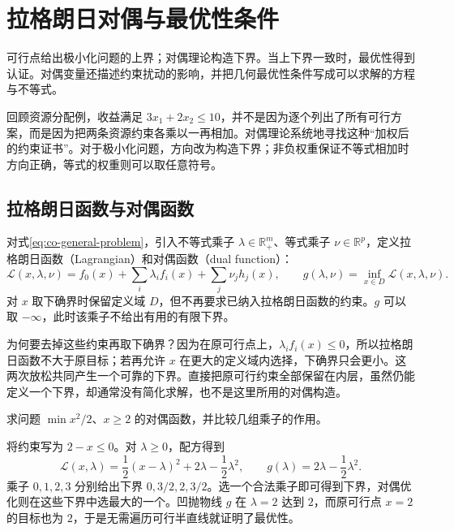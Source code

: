 \setcounter{chapter}{4} %
\chapter{拉格朗日对偶与最优性条件}
\label{ch:co-duality}

可行点给出极小化问题的上界；对偶理论构造下界。当上下界一致时，最优性得到认证。对偶变量还描述约束扰动的影响，并把几何最优性条件写成可以求解的方程与不等式。

回顾资源分配例，收益满足 $3x_1+2x_2\leq10$，并不是因为逐个列出了所有可行方案，而是因为把两条资源约束各乘以一再相加。对偶理论系统地寻找这种“加权后的约束证书”。对于极小化问题，方向改为构造下界；非负权重保证不等式相加时方向正确，等式的权重则可以取任意符号。

\section{拉格朗日函数与对偶函数}

对式\eqref{eq:co-general-problem}，引入不等式乘子 $\lambda\in\mathbb R_+^m$、等式乘子 $\nu\in\mathbb R^p$，定义拉格朗日函数（Lagrangian）和对偶函数（dual function）：
\begin{equation}
 \mathcal L(x,\lambda,\nu)=f_0(x)+\sum_i\lambda_i f_i(x)+\sum_j\nu_j h_j(x),
 \qquad g(\lambda,\nu)=\inf_{x\in D}\mathcal L(x,\lambda,\nu).
 \label{eq:co-lagrangian-dual-function}
\end{equation}
对 $x$ 取下确界时保留定义域 $D$，但不再要求已纳入拉格朗日函数的约束。$g$ 可以取 $-\infty$，此时该乘子不给出有用的有限下界。

为何要去掉这些约束再取下确界？因为在原可行点上，$\lambda_i f_i(x)\leq0$，所以拉格朗日函数不大于原目标；若再允许 $x$ 在更大的定义域内选择，下确界只会更小。这两次放松共同产生一个可靠的下界。直接把原可行约束全部保留在内层，虽然仍能定义一个下界，却通常没有简化求解，也不是这里所用的对偶构造。

\begin{example}[一个可以画出全部下界的对偶]
求问题 $\min x^2/2$、$x\geq2$ 的对偶函数，并比较几组乘子的作用。
\end{example}
\begin{solve}
将约束写为 $2-x\leq0$。对 $\lambda\geq0$，配方得到
\[
 \mathcal L(x,\lambda)=\frac12(x-\lambda)^2
                  +2\lambda-\frac12\lambda^2,\qquad
 g(\lambda)=2\lambda-\frac12\lambda^2.
\]
乘子 $0,1,2,3$ 分别给出下界 $0,3/2,2,3/2$。选一个合法乘子即可得到下界，对偶优化则在这些下界中选最大的一个。凹抛物线 $g$ 在 $\lambda=2$ 达到 $2$，而原可行点 $x=2$ 的目标也为 $2$，于是无需遍历可行半直线就证明了最优性。
\end{solve}

